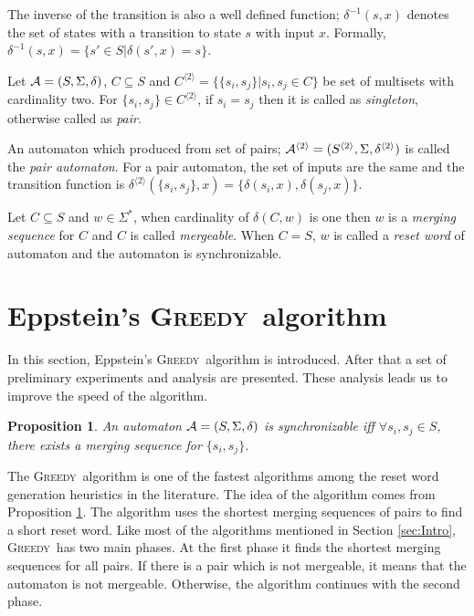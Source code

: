 \documentclass[12pt]{article}
\newtheorem{proposition}{Proposition}[section]
\newcommand{\comment}[2]{{\color{red}{\bf (#1: #2)}}}
\newcommand{\greedyAlgo}{\textsc{Greedy}}
\begin{document}
The inverse of the transition is also a well defined function; $\delta^{-1}(s,x)$ denotes the set of states with a transition to state $s$ with input $x$. Formally, $\delta^{-1}(s,x) = \{ s' \in S | \delta(s',x)= s\}$.

Let ${\cal A}=(S, \Sigma, \delta)$, $C \subseteq S$ and $C^{\langle 2 \rangle} = \{ \{ s_i, s_j \}| s_i,s_j \in C \}$ be set of multisets  with cardinality two. For $\{ s_i, s_j \} \in C^{\langle 2 \rangle}$, if $s_i=s_j$ then it is called as \textit{singleton}, otherwise called as \textit{pair}. 

An automaton which produced from set of pairs; ${\cal A}^{\langle 2 \rangle}=(S^{\langle 2 \rangle},\Sigma,\delta^{\langle 2 \rangle})$ is called the \textit{pair automaton}. For a pair automaton, the set of inputs are the same and the transition function is $\delta^{\langle 2 \rangle}(\{ s_i,s_j \},x) = \{ \delta(s_i,x), \delta(s_j,x) \}$. \comment{sertac}{pair automata icin figure cizilebilir}

Let $C \subseteq S$ and $w \in \Sigma^*$, when cardinality of $\delta(C,w)$ is one then $w$ is a \textit{merging sequence} for $C$ and $C$ is called \textit{mergeable}. When $C=S$, $w$ is called a \textit{reset word} of automaton and the automaton is synchronizable.

\clearpage
\section{Eppstein's \greedyAlgo\ algorithm}
\label{sec:greedy}
In this section, Eppstein's \greedyAlgo\ algorithm is introduced. After that a set of preliminary experiments and analysis are presented. These analysis leads us to improve the speed of the algorithm.

\begin{proposition}
	\label{prop:synchronizable}
	An automaton ${\cal A}=(S,\Sigma,\delta)$ is synchronizable iff $\forall s_i,s_j \in S$, there exists a merging sequence for $\{ s_i, s_j \}$.
\end{proposition}

The \greedyAlgo\ algorithm is one of the fastest algorithms among the reset word generation heuristics in the literature. The idea of the algorithm comes from Proposition \ref{prop:synchronizable}. The algorithm uses the shortest merging sequences of pairs to find a short reset word. Like most of the algorithms mentioned in Section \ref{sec:Intro}, \greedyAlgo\ has two main phases. At the first phase it finds the shortest merging sequences for all pairs. If there is a pair which is not mergeable, it means that the automaton is not mergeable. Otherwise, the algorithm continues with the second phase.
\end{document}
